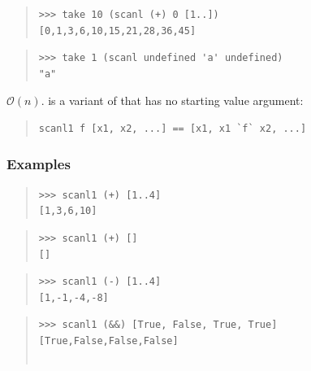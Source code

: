\begin{haddockdesc}
{\begin{quote}
{\begin{verbatim}
\end{verbatim}}
\end{quote}
\begin{quote}
{\haddockverb\begin{verbatim}
>>> take 10 (scanl (+) 0 [1..])
[0,1,3,6,10,15,21,28,36,45]

\end{verbatim}}
\end{quote}
\begin{quote}
{\haddockverb\begin{verbatim}
>>> take 1 (scanl undefined 'a' undefined)
"a"

\end{verbatim}}
\end{quote}}
\end{haddockdesc}
\begin{haddockdesc}
\item[\begin{tabular}{@{}l}
scanl1 :: (a -> a -> a) -> {\char 91}a{\char 93} -> {\char 91}a{\char 93}
\end{tabular}]
{\haddockbegindoc
\(\mathcal{O}(n)\).  is a variant of  that has no starting
 value argument:\par
\begin{quote}
{\haddockverb\begin{verbatim}
scanl1 f [x1, x2, ...] == [x1, x1 `f` x2, ...]\end{verbatim}}
\end{quote}
\subsubsection*{\textbf{Examples}}
\begin{quote}
{\haddockverb\begin{verbatim}
>>> scanl1 (+) [1..4]
[1,3,6,10]

\end{verbatim}}
\end{quote}
\begin{quote}
{\haddockverb\begin{verbatim}
>>> scanl1 (+) []
[]

\end{verbatim}}
\end{quote}
\begin{quote}
{\haddockverb\begin{verbatim}
>>> scanl1 (-) [1..4]
[1,-1,-4,-8]

\end{verbatim}}
\end{quote}
\begin{quote}
{\haddockverb\begin{verbatim}
>>> scanl1 (&&) [True, False, True, True]
[True,False,False,False]


\end{verbatim}}
\end{quote}}
\end{haddockdesc}
